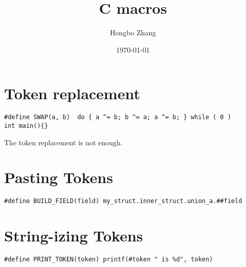 \documentclass[11pt]{article}
\title{C macros}
\author{Hongbo Zhang}
\date{\today}
\begin{document}
\maketitle

\setcounter{tocdepth}{3}
\tableofcontents
\vspace*{1cm}






\section{Token replacement}
\label{sec-1}


\begin{verbatim}
#define SWAP(a, b)  do { a ^= b; b ^= a; a ^= b; } while ( 0 )
int main(){}
\end{verbatim}

The token replacement is not enough.
\section{Pasting Tokens}
\label{sec-2}


\begin{verbatim}
#define BUILD_FIELD(field) my_struct.inner_struct.union_a.##field
\end{verbatim}
\section{String-izing Tokens}
\label{sec-3}


\begin{verbatim}
#define PRINT_TOKEN(token) printf(#token " is %d", token)
\end{verbatim}
\end{document}

